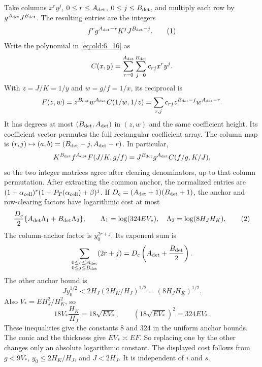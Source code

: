 Take columns \(x^r y^j\), \(0\le r\le A_{\rm det}\),
\(0\le j\le B_{\rm det}\), and multiply each row by
\(g^{A_{\rm det}}J^{B_{\rm det}}\).  The resulting entries are the integers
\[
 f^r g^{A_{\rm det}-r}K^jJ^{B_{\rm det}-j}.             \AutoTag{eq:old:6_17c}
\]
Write the polynomial in \eqref{eq:old:6_16} as
\[
C(x,y)=\sum_{r=0}^{A_{\rm det}}\sum_{j=0}^{B_{\rm det}}c_{rj}x^ry^j.
\]
With \(z=J/K=1/y\) and \(w=g/f=1/x\), its reciprocal is
\[
F(z,w)=z^{B_{\rm det}}w^{A_{\rm det}}C(1/w,1/z)
 =\sum_{r,j}c_{rj}z^{B_{\rm det}-j}w^{A_{\rm det}-r}.
\]
It has degrees at most \((B_{\rm det},A_{\rm det})\) in \((z,w)\) and the
same coefficient height.  Its coefficient vector permutes the full
rectangular coefficient array.  The column map is
\((r,j)\mapsto(a,b)=(B_{\rm det}-j,A_{\rm det}-r)\).  In particular,
\[
K^{B_{\rm det}}f^{A_{\rm det}}F(J/K,g/f)
 =J^{B_{\rm det}}g^{A_{\rm det}}C(f/g,K/J),
\]
so the two integer matrices agree after clearing denominators, up to that
column permutation.
After extracting the common anchor, the normalized entries are
\((1+\alpha_{\rm cell})^r(1+P_T(\alpha_{\rm cell})+\beta)^j\).  If
\(D_c=(A_{\rm det}+1)(B_{\rm det}+1)\),
the anchor and row-clearing factors have logarithmic cost at most
\[
 \frac{D_c}{2}\{A_{\rm det}\Lambda_1+B_{\rm det}\Lambda_2\},\qquad
 \Lambda_1=\log(324EV_*),\quad\Lambda_2=\log(8H_JH_K),
\AutoTag{eq:old:6_17d}
\]
The column-anchor factor is \(y_0^{2r+j}\).  Its exponent sum is
\[
\sum_{\substack{0\le r\le A_{\rm det}\\0\le j\le B_{\rm det}}}(2r+j)
=D_c\left(A_{\rm det}+\frac{B_{\rm det}}2\right).
\]
The other anchor bound is
\[
J y_0^{1/2}<2H_J(2H_K/H_J)^{1/2}=(8H_JH_K)^{1/2}.
\]
Also \(V_*=E H_J^2/H_K^2\), so
\[
18V_*\frac{H_K}{H_J}=18\sqrt{EV_*},\qquad
(18\sqrt{EV_*})^2=324EV_*.
\]
These inequalities give the constants \(8\) and \(324\) in the uniform
anchor bounds.
The conic and the thickness give \(EV_*\asymp EF\).  So replacing one by
the other changes only an absolute logarithmic constant.  The displayed
cost follows from \(g<9V_*\), \(y_0\le2H_K/H_J\), and \(J<2H_J\).
It is independent of \(i\) and \(s\).

